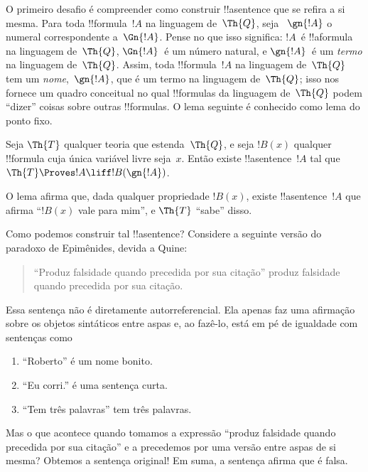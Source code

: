 \documentclass[../../../include/open-logic-section]{subfiles}
\begin{document}
O primeiro desafio é compreender como construir !!a{sentence} que se refira
a si mesma. Para toda !!{formula}~$!A$ na linguagem de~$\Th{Q}$, seja
~$\gn{!A}$ o numeral correspondente a~$\Gn{!A}$. Pense no que isso
significa: $!A$~é !!a{formula} na linguagem de~$\Th{Q}$,
$\Gn{!A}$~é um número natural, e $\gn{!A}$~é um \emph{termo} na linguagem
de~$\Th{Q}$. Assim, toda !!{formula}~$!A$ na linguagem de~$\Th{Q}$ tem um
\emph{nome},~$\gn{!A}$, que é um termo na linguagem de~$\Th{Q}$; isso nos
fornece um quadro conceitual no qual !!{formula}s da linguagem de~$\Th{Q}$
podem ``dizer'' coisas sobre outras !!{formula}s. O lema seguinte é
conhecido como lema do ponto fixo.

\begin{lem}
Seja $\Th{T}$ qualquer teoria que estenda~$\Th{Q}$, e seja $!B(x)$ qualquer
!!{formula} cuja única variável livre seja~$x$. Então existe
!!a{sentence}~$!A$ tal que $\Th{T} \Proves!A \liff !B(\gn{!A})$.
\end{lem}

O lema afirma que, dada qualquer propriedade $!B(x)$, existe
!!a{sentence}~$!A$ que afirma ``$!B(x)$ vale para mim'', e $\Th{T}$
``sabe'' disso.

Como podemos construir tal !!a{sentence}? Considere a seguinte versão do
paradoxo de Epimênides, devida a Quine:
\begin{quote}
``Produz falsidade quando precedida por sua citação'' produz falsidade
quando precedida por sua citação.
\end{quote}
Essa sentença não é diretamente autorreferencial. Ela apenas faz uma
afirmação sobre os objetos sintáticos entre aspas e, ao fazê-lo, está em pé
de igualdade com sentenças como
\begin{enumerate}
\item ``Roberto'' é um nome bonito.
\item ``Eu corri.'' é uma sentença curta.
\item ``Tem três palavras'' tem três palavras.
\end{enumerate}
Mas o que acontece quando tomamos a expressão ``produz falsidade quando
precedida por sua citação'' e a precedemos por uma versão entre aspas de si
mesma? Obtemos a sentença original!{} Em suma, a sentença afirma que é
falsa.
\end{document}
